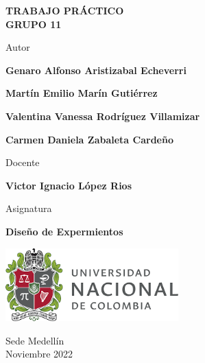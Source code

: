 \begin{titlepage}
   \Large{
   \begin{center}
       \vspace*{1cm}

       \textbf{TRABAJO PRÁCTICO} \\
       \textbf{GRUPO 11}

            
       \vspace{1 cm}
       
       Autor
       
       \vspace{0.3cm}
       
       \textbf{Genaro Alfonso Aristizabal Echeverri} \\
      
              \vspace{0.2 cm}
      
       \textbf{Martín Emilio Marín Gutiérrez} \\
      
              \vspace{0.2 cm}
        
       \textbf{Valentina Vanessa Rodríguez Villamizar} \\
      
              \vspace{0.2 cm}
              
       \textbf{Carmen Daniela Zabaleta Cardeño} \\
      
              \vspace{0.8 cm}
       
      
       Docente
       
       \vspace{0.5 cm}

	\textbf{Victor Ignacio López Rios} 
       
       \vspace{0.5 cm}

       \vspace{0.5 cm}
       
       Asignatura
       
       \vspace{0.5cm}

       \textbf{Diseño de Expermientos}

       \vfill

            
       \vspace{0.1cm}
     
       \includegraphics[width=0.5\textwidth]{logo.png}
            
       Sede Medellín\\
       Noviembre 2022
       
   \end{center}
   }
\end{titlepage}